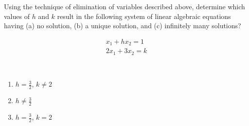 Using the technique of elimination of variables described above, determine which values of $h$ and $k$ result in the following system of linear algebraic equations having (a) no solution, (b) a unique solution, and (c) infinitely many solutions?

\begin{align*}
    x_1 + hx_2 = 1 \\
    2x_1 + 3x_2 = k
\end{align*}

\begin{solution}\
    \begin{enumerate}
        \item $h = \frac{3}{2}$, $k\neq2$
        \item $h \neq \frac{3}{2}$
        \item $h = \frac{3}{2}$, $k = 2$
    \end{enumerate}
\end{solution}